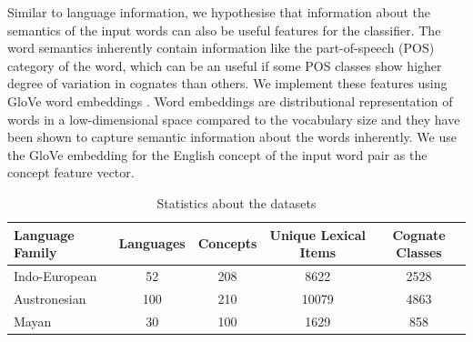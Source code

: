 \documentclass[11pt,letterpaper]{article}
\begin{document}
Similar to language information, we hypothesise that information about the semantics of the input words can also be useful features for the classifier. The word semantics inherently contain information like the part-of-speech (POS) category of the word, which can be an useful if some POS classes show higher degree of variation in cognates than others. We implement these features using GloVe word embeddings \cite{pennington2014glove}. Word embeddings are distributional representation of words in a low-dimensional space compared to the vocabulary size and they have been shown to capture semantic information about the words inherently. We use the GloVe embedding for the English concept of the input word pair as the concept feature vector.

\begin{table}[ht]
\centering
\begin{tabular}{lcccc}
Language Family & Languages & Concepts & Unique Lexical Items & Cognate Classes \\ \hline
Indo-European   & 52        & 208      & 8622                & 2528            \\
Austronesian    & 100       & 210      & 10079                & 4863            \\
Mayan           & 30        & 100      & 1629                 & 858            
\end{tabular}
\caption{Statistics about the datasets}
\label{datastat}
\end{table}
\end{document}
